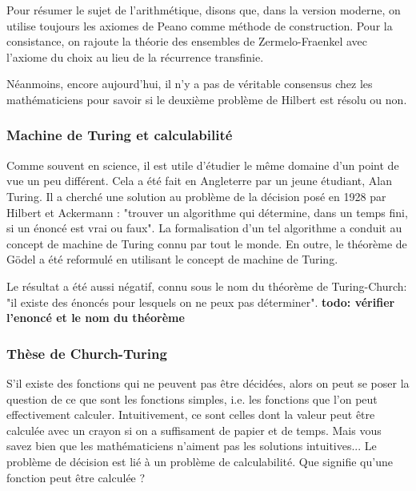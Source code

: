 
Pour résumer le sujet de l'arithmétique, disons que, dans la version moderne, on utilise toujours les axiomes de Peano comme méthode de construction.
Pour la consistance, on rajoute la théorie des ensembles de Zermelo-Fraenkel avec l'axiome du choix au lieu de la récurrence transfinie.

Néanmoins, encore aujourd'hui, il n'y a pas de véritable consensus chez les mathématiciens pour savoir si le deuxième problème de Hilbert est résolu ou non.

\subsubsection*{Machine de Turing et calculabilité}
Comme souvent en science, il est utile d'étudier le même domaine d'un point de vue un peu différent. Cela a été fait en Angleterre par un jeune étudiant, Alan Turing. Il a cherché une solution au problème de la décision posé en 1928 par Hilbert et Ackermann : "trouver un algorithme qui détermine, dans un temps fini, si un énoncé est vrai ou faux". La formalisation d'un tel algorithme a conduit au concept de machine de Turing connu par tout le monde. En outre, le théorème de Gödel a été reformulé en utilisant le concept de machine de Turing.

Le résultat a été aussi négatif, connu sous le nom du théorème de Turing-Church: "il existe des énoncés pour lesquels on ne peux pas déterminer".
\textbf{todo: vérifier l'enoncé et le nom du théorème}

\subsubsection*{Thèse de Church-Turing}
S'il existe des fonctions qui ne peuvent pas être décidées, alors on peut se poser la question de ce que sont les fonctions simples, i.e. les fonctions que l'on peut effectivement calculer.
Intuitivement, ce sont celles dont la valeur peut être calculée avec un crayon si on a suffisament de papier et de temps.
Mais vous savez bien que les mathématiciens n'aiment pas les solutions intuitives...
Le problème de décision est lié à un problème de calculabilité. Que signifie qu'une fonction peut être calculée ?

